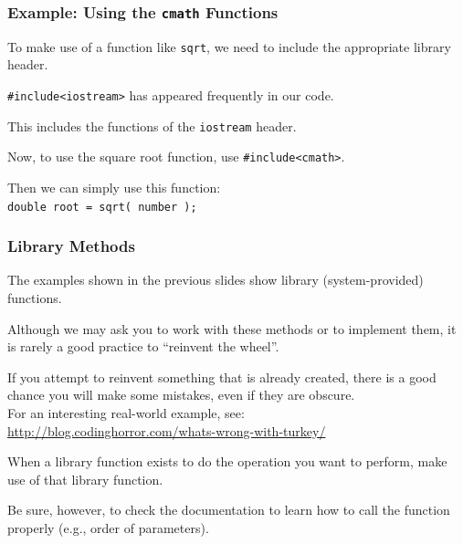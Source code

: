 \begin{frame}[fragile]
\frametitle{Example: Using the \texttt{cmath} Functions}

To make use of a function like \texttt{sqrt}, we need to include the appropriate library header.

\texttt{\#include<iostream>} has appeared frequently in our code.

This includes the functions of the \texttt{iostream} header.

Now, to use the square root function, use \texttt{\#include<cmath>}.

Then we can simply use this function:\\
\quad \texttt{double root = sqrt( number );}

\end{frame}

\begin{frame}
\frametitle{Library Methods}

The examples shown in the previous slides show library (system-provided) functions.

Although we may ask you to work with these methods or to implement them, it is rarely a good practice to ``reinvent the wheel''.

If you attempt to reinvent something that is already created, there is a good chance you will make some mistakes, even if they are obscure.\\
\quad For an interesting real-world example, see:\\
\quad \url{http://blog.codinghorror.com/whats-wrong-with-turkey/}

When a library function exists to do the operation you want to perform, make use of that library function.

Be sure, however, to check the documentation to learn how to call the function properly (e.g., order of parameters).

\end{frame}




